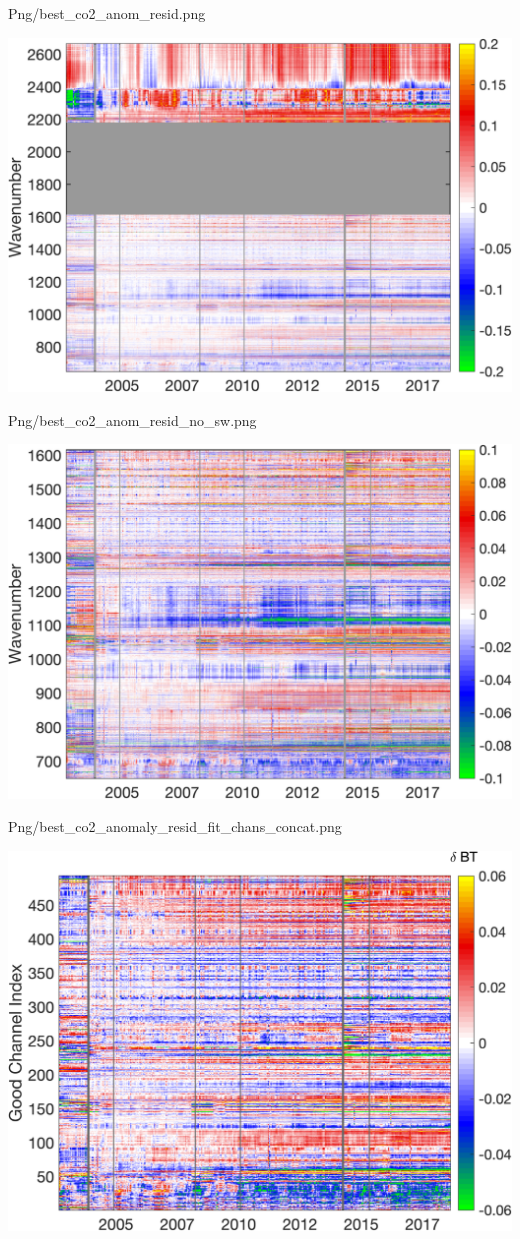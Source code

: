 \documentclass[10pt,t]{beamer}
\begin{document}
\begin{frame}[label={sec:orgc28c0e9}]{Png/best\_co2\_anom\_resid.png}
\begin{center}
\includegraphics[width=0.7\linewidth]{./Figs/Png/best_co2_anom_resid.png}
\end{center}
\end{frame}

\begin{frame}[label={sec:org878893e}]{Png/best\_co2\_anom\_resid\_no\_sw.png}
\begin{center}
\includegraphics[width=0.7\linewidth]{./Figs/Png/best_co2_anom_resid_no_sw.png}
\end{center}
\end{frame}

\begin{frame}[label={sec:orgf4832a9}]{Png/best\_co2\_anomaly\_resid\_fit\_chans\_concat.png}
\begin{center}
\includegraphics[width=0.7\linewidth]{./Figs/Png/best_co2_anomaly_resid_fit_chans_concat.png}
\end{center}
\end{frame}
\end{document}
